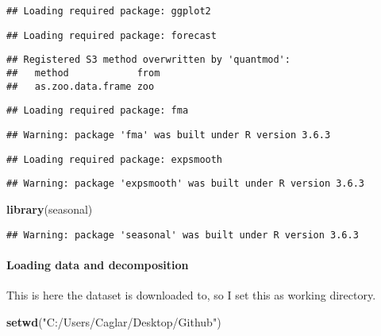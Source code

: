 \documentclass[
]{article}
\newenvironment{Shaded}{\begin{snugshade}}{\end{snugshade}}
\newcommand{\KeywordTok}[1]{\textcolor[rgb]{0.13,0.29,0.53}{\textbf{#1}}}
\newcommand{\NormalTok}[1]{#1}
\newcommand{\StringTok}[1]{\textcolor[rgb]{0.31,0.60,0.02}{#1}}
\begin{document}
\begin{verbatim}
## Loading required package: ggplot2
\end{verbatim}

\begin{verbatim}
## Loading required package: forecast
\end{verbatim}

\begin{verbatim}
## Registered S3 method overwritten by 'quantmod':
##   method            from
##   as.zoo.data.frame zoo
\end{verbatim}

\begin{verbatim}
## Loading required package: fma
\end{verbatim}

\begin{verbatim}
## Warning: package 'fma' was built under R version 3.6.3
\end{verbatim}

\begin{verbatim}
## Loading required package: expsmooth
\end{verbatim}

\begin{verbatim}
## Warning: package 'expsmooth' was built under R version 3.6.3
\end{verbatim}

\begin{Shaded}
\begin{Highlighting}[]
\KeywordTok{library}\NormalTok{(seasonal)}
\end{Highlighting}
\end{Shaded}

\begin{verbatim}
## Warning: package 'seasonal' was built under R version 3.6.3
\end{verbatim}

\hypertarget{loading-data-and-decomposition}{%
\paragraph{Loading data and
decomposition}\label{loading-data-and-decomposition}}

This is here the dataset is downloaded to, so I set this as working
directory.

\begin{Shaded}
\begin{Highlighting}[]
\KeywordTok{setwd}\NormalTok{(}\StringTok{"C:/Users/Caglar/Desktop/Github"}\NormalTok{)}
\end{Highlighting}
\end{Shaded}
\end{document}
